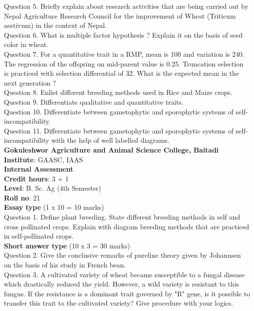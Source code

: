 \documentclass[12pt]{article}\usepackage[]{graphicx}\usepackage[]{color}
\begin{document}
Question 5. Briefly explain about research activities that are being carried out by Nepal Agriculture Research Council for the improvement of Wheat (Triticum aestivum) in the context of Nepal.\\
Question 6. What is multiple factor hypothesis ? Explain it on the basis of seed color in wheat.\\
Question 7. For a quantitative trait in a RMP, mean is 100 and variation is 240. The regression of the offspring on mid-parent value is 0.25. Truncation selection is practiced with selection differential of 32. What is the expected mean in the next generation ?\\
Question 8. Enlist different breeding methods used in Rice and Maize crops.\\
Question 9. Differentiate qualitative and quantitative traits.\\
Question 10. Differentiate between gametophytic and sporophytic systems of self-incompatibility.\\
Question 11. Differentiate between gametophytic and sporophytic systems of self-incompatibility with the help of well labelled diagrams.\\
\clearpage 
{\centering \Large{\textbf{Gokuleshwor Agriculture and Animal Science College, Baitadi}} \\[0.25cm]
            \textbf{Institute}: GAASC, IAAS \\[0.2cm]
            \textbf{Internal Assessment} \\[0.2cm]} 
\textbf{Credit hours}: 3 + 1 \\ 
\textbf{Level}: B. Sc. Ag (4th Semester) \\
\textbf{Roll no}: 21 \\[0.5cm] 
\textbf{Essay type} (1 x 10 = 10 marks) \\
Question 1. Define plant breeding. State different breeding methods in self and cross pollinated crops. Explain with diagram breeding methods that are practiced in self-pollinated crops.\\
\textbf{Short answer type} (10 x 3 = 30 marks) \\
Question 2. Give the conclusive remarks of pureline theory given by Johannsen on the basis of his study in French bean.\\
Question 3. A cultivated variety of wheat became susceptible to a fungal disease which drastically reduced the yield. However, a wild variety is resistant to this fungus. If the resistance is a dominant trait governed by "R" gene, is it possible to transfer this trait to the cultivated variety? Give procedure with your logics.\\
\end{document}

